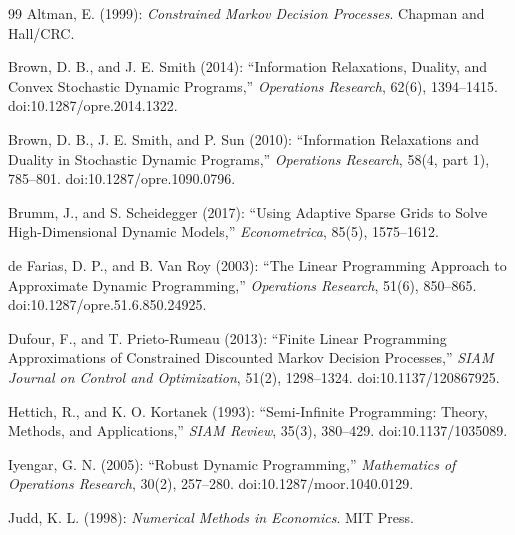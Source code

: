 \begingroup
\makeatletter
\renewcommand{\bibsection}{\@ifundefined{old@section}{\section*{\bibname}}{\old@section*{\bibname}}}
\makeatother
\begin{thebibliography}{99}
Altman, E. (1999): \emph{Constrained Markov Decision Processes}. Chapman and Hall/CRC.

Brown, D. B., and J. E. Smith (2014): ``Information Relaxations, Duality, and Convex Stochastic Dynamic Programs,'' \emph{Operations Research}, 62(6), 1394--1415. doi:10.1287/opre.2014.1322.

Brown, D. B., J. E. Smith, and P. Sun (2010): ``Information Relaxations and Duality in Stochastic Dynamic Programs,'' \emph{Operations Research}, 58(4, part 1), 785--801. doi:10.1287/opre.1090.0796.

Brumm, J., and S. Scheidegger (2017): ``Using Adaptive Sparse Grids to Solve High-Dimensional Dynamic Models,'' \emph{Econometrica}, 85(5), 1575--1612.

de Farias, D. P., and B. Van Roy (2003): ``The Linear Programming Approach to Approximate Dynamic Programming,'' \emph{Operations Research}, 51(6), 850--865. doi:10.1287/opre.51.6.850.24925.

Dufour, F., and T. Prieto-Rumeau (2013): ``Finite Linear Programming Approximations of Constrained Discounted Markov Decision Processes,'' \emph{SIAM Journal on Control and Optimization}, 51(2), 1298--1324. doi:10.1137/120867925.

Hettich, R., and K. O. Kortanek (1993): ``Semi-Infinite Programming: Theory, Methods, and Applications,'' \emph{SIAM Review}, 35(3), 380--429. doi:10.1137/1035089.

Iyengar, G. N. (2005): ``Robust Dynamic Programming,'' \emph{Mathematics of Operations Research}, 30(2), 257--280. doi:10.1287/moor.1040.0129.

Judd, K. L. (1998): \emph{Numerical Methods in Economics}. MIT Press.


\end{thebibliography}
